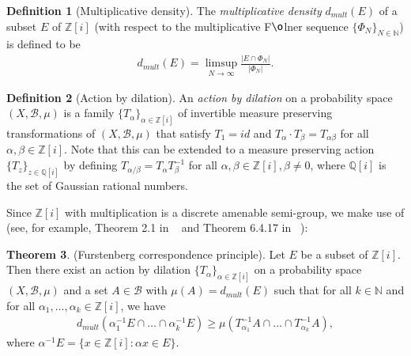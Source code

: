 \documentclass[12pt,amstex]{amsart}
\theoremstyle{definition}
\newtheorem{thm}{Theorem}[section]
\newtheorem{defn}[thm]{Definition}
\def \Z {\mathbb{Z}[i]}
\def \A {\alpha}
\def \B {\beta}
\begin{document}
\begin{defn}[Multiplicative density]
  The \emph{multiplicative density} $d_{mult}(E)$ of a subset $E$ of $\Z$ (with respect to the multiplicative F${\o}$lner sequence $\{\Phi_{N}\}_{N\in\mathbb{N}}$) is defined to be
  \begin{equation}\nonumber
  \begin{split}
    d_{mult}(E)=\limsup_{N\rightarrow\infty}\frac{\vert E\cap\Phi_{N}\vert}{\vert \Phi_{N}\vert}.
  \end{split}
  \end{equation}
\end{defn}

\begin{defn}[Action by dilation]
  An \emph{action by dilation} on a probability space $(X,\mathcal{B},\mu)$ is a family $\{T_{\A}\}_{\A\in\Z}$ of invertible measure preserving transformations of $(X,\mathcal{B},\mu)$ that satisfy $T_{1}=id$ and $T_{\A}\cdot T_{\B}=T_{\A\B}$ for all $\A,\B\in\Z$. Note that this can be extended to a measure preserving action $\{T_{z}\}_{z\in\mathbb{Q}[i]}$ by defining $T_{\A/\B}=T_{\A}T_{\B}^{-1}$ for all $\A,\B\in\Z, \B\neq 0$, where $\mathbb{Q}[i]$ is the set of Gaussian rational numbers.
\end{defn}

Since $\Z$ with multiplication is a discrete amenable semi-group, we make use of (see, for example,  Theorem 2.1 in ~\cite{BM2} and Theorem 6.4.17 in ~\cite{B3}):

\begin{thm}\label{FC}(Furstenberg correspondence principle).
  Let $E$ be a subset of $\mathbb{Z}[i]$. Then there exist an action by dilation $\{T_{\A}\}_{\A\in\Z}$ on a probability space $(X,\mathcal{B},\mu)$ and a set $A\in\mathcal{B}$ with $\mu(A)=d_{mult}(E)$ such that for all $k\in\mathbb{N}$ and for all $\A_{1},\dots,\A_{k}\in\Z$, we have
    \begin{equation}\nonumber
  \begin{split}
    d_{mult}(\A_{1}^{-1}E\cap\dots\cap \A_{k}^{-1}E)\geq\mu(T_{\A_{1}}^{-1}A\cap\dots\cap T_{\A_{k}}^{-1}A),
  \end{split}
  \end{equation}
  where $\A^{-1}E=\{x\in\Z\colon \A x\in E\}$.
\end{thm}
\end{document}
